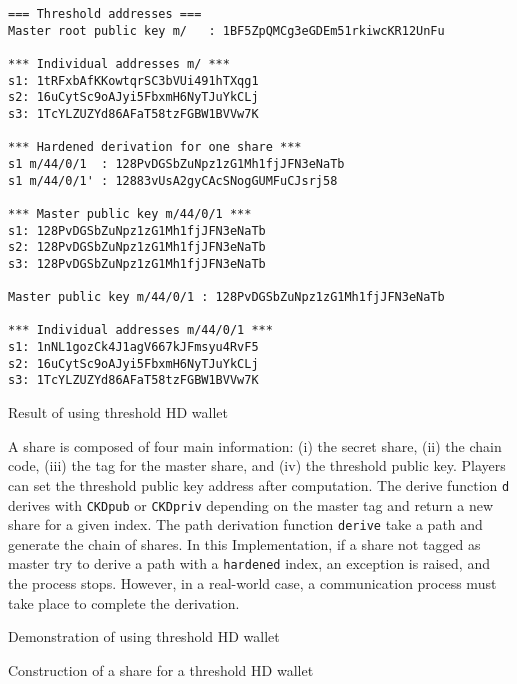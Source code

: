 \begin{listing}
  \begin{verbatim}
=== Threshold addresses ===
Master root public key m/   : 1BF5ZpQMCg3eGDEm51rkiwcKR12UnFu

*** Individual addresses m/ ***
s1: 1tRFxbAfKKowtqrSC3bVUi491hTXqg1
s2: 16uCytSc9oAJyi5FbxmH6NyTJuYkCLj
s3: 1TcYLZUZYd86AFaT58tzFGBW1BVVw7K

*** Hardened derivation for one share ***
s1 m/44/0/1  : 128PvDGSbZuNpz1zG1Mh1fjJFN3eNaTb
s1 m/44/0/1' : 12883vUsA2gyCAcSNogGUMFuCJsrj58

*** Master public key m/44/0/1 ***
s1: 128PvDGSbZuNpz1zG1Mh1fjJFN3eNaTb
s2: 128PvDGSbZuNpz1zG1Mh1fjJFN3eNaTb
s3: 128PvDGSbZuNpz1zG1Mh1fjJFN3eNaTb

Master public key m/44/0/1 : 128PvDGSbZuNpz1zG1Mh1fjJFN3eNaTb

*** Individual addresses m/44/0/1 ***
s1: 1nNL1gozCk4J1agV667kJFmsyu4RvF5
s2: 16uCytSc9oAJyi5FbxmH6NyTJuYkCLj
s3: 1TcYLZUZYd86AFaT58tzFGBW1BVVw7K
  \end{verbatim}
	\caption{Result of using threshold HD wallet}
	\label{lst:testThresholdHDMainRes}
\end{listing}

A share is composed of four main information: (i) the secret share, (ii) the
chain code, (iii) the tag for the master share, and (iv) the threshold public
key. Players can set the threshold public key address after computation. The
derive function \texttt{d} derives with \texttt{CKDpub} or \texttt{CKDpriv}
depending on the master tag and return a new share for a given index. The path
derivation function \texttt{derive} take a path and generate the chain of
shares. In this Implementation, if a share not tagged as master try to derive a
path with a \texttt{hardened} index, an exception is raised, and the process
stops. However, in a real-world case, a communication process must take place to
complete the derivation.

\begin{listing}
	\caption{Demonstration of using threshold HD wallet}
	\label{lst:testThresholdHDMain}
\end{listing}

\begin{listing}
	\caption{Construction of a share for a threshold HD wallet}
	\label{lst:testThresholdHDShare}
\end{listing}


